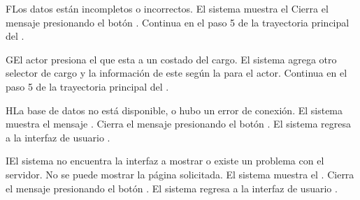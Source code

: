 \begin{UCtrayectoriaA}{F}{Los datos están incompletos o incorrectos.}
 \UCpaso El sistema muestra el 
 \UCpaso[\UCactor] Cierra el mensaje presionando el botón .
 \UCpaso Continua en el paso 5 de la trayectoria principal del .
\end{UCtrayectoriaA}

\begin{UCtrayectoriaA}{G}{El actor presiona el \IUbutton{+} que esta a un costado del cargo.}
 \UCpaso El sistema agrega otro selector de cargo y la información de este según la  para el actor.
 \UCpaso Continua en el paso 5 de la trayectoria principal del .
\end{UCtrayectoriaA}


\begin{UCtrayectoriaA}{H}{La base de datos no está disponible, o hubo un error de conexión.}
    \UCpaso El sistema muestra el mensaje .
    \UCpaso[\UCactor] Cierra el mensaje presionando el botón .
    \UCpaso El sistema regresa a la interfaz de usuario .
\end{UCtrayectoriaA}

\begin{UCtrayectoriaA}{I}{El sistema no encuentra la interfaz a mostrar o existe un problema con el servidor.}
    \UCpaso No se puede mostrar la página solicitada.
    \UCpaso El sistema muestra el .
    \UCpaso[\UCactor] Cierra el mensaje presionando el botón .
    \UCpaso El sistema regresa a la interfaz de usuario .
\end{UCtrayectoriaA}
